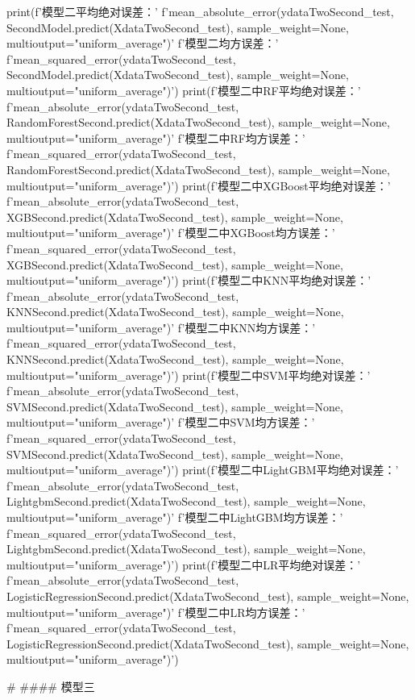 \documentclass{MathorCupmodeling}
\begin{document}
\begin{python}
print(f'模型二平均绝对误差：'
      f'{mean_absolute_error(ydataTwoSecond_test, SecondModel.predict(XdataTwoSecond_test), sample_weight=None, multioutput="uniform_average")}\n'
      f'模型二均方误差：'
      f'{mean_squared_error(ydataTwoSecond_test, SecondModel.predict(XdataTwoSecond_test), sample_weight=None, multioutput="uniform_average")}')
print(f'模型二中RF平均绝对误差：'
      f'{mean_absolute_error(ydataTwoSecond_test, RandomForestSecond.predict(XdataTwoSecond_test), sample_weight=None, multioutput="uniform_average")}\n'
      f'模型二中RF均方误差：'
      f'{mean_squared_error(ydataTwoSecond_test, RandomForestSecond.predict(XdataTwoSecond_test), sample_weight=None, multioutput="uniform_average")}')
print(f'模型二中XGBoost平均绝对误差：'
      f'{mean_absolute_error(ydataTwoSecond_test, XGBSecond.predict(XdataTwoSecond_test), sample_weight=None, multioutput="uniform_average")}\n'
      f'模型二中XGBoost均方误差：'
      f'{mean_squared_error(ydataTwoSecond_test, XGBSecond.predict(XdataTwoSecond_test), sample_weight=None, multioutput="uniform_average")}')
print(f'模型二中KNN平均绝对误差：'
      f'{mean_absolute_error(ydataTwoSecond_test, KNNSecond.predict(XdataTwoSecond_test), sample_weight=None, multioutput="uniform_average")}\n'
      f'模型二中KNN均方误差：'
      f'{mean_squared_error(ydataTwoSecond_test, KNNSecond.predict(XdataTwoSecond_test), sample_weight=None, multioutput="uniform_average")}')
print(f'模型二中SVM平均绝对误差：'
      f'{mean_absolute_error(ydataTwoSecond_test, SVMSecond.predict(XdataTwoSecond_test), sample_weight=None, multioutput="uniform_average")}\n'
      f'模型二中SVM均方误差：'
      f'{mean_squared_error(ydataTwoSecond_test, SVMSecond.predict(XdataTwoSecond_test), sample_weight=None, multioutput="uniform_average")}')
print(f'模型二中LightGBM平均绝对误差：'
      f'{mean_absolute_error(ydataTwoSecond_test, LightgbmSecond.predict(XdataTwoSecond_test), sample_weight=None, multioutput="uniform_average")}\n'
      f'模型二中LightGBM均方误差：'
      f'{mean_squared_error(ydataTwoSecond_test, LightgbmSecond.predict(XdataTwoSecond_test), sample_weight=None, multioutput="uniform_average")}')
print(f'模型二中LR平均绝对误差：'
      f'{mean_absolute_error(ydataTwoSecond_test, LogisticRegressionSecond.predict(XdataTwoSecond_test), sample_weight=None, multioutput="uniform_average")}\n'
      f'模型二中LR均方误差：'
      f'{mean_squared_error(ydataTwoSecond_test, LogisticRegressionSecond.predict(XdataTwoSecond_test), sample_weight=None, multioutput="uniform_average")}')


# #### 模型三


\end{python}
\end{document}
